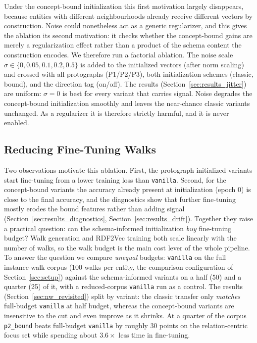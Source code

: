 \documentclass[a4paper,oneside,bibliography=totoc]{scrbook}
\begin{document}
Under the concept-bound initialization this first motivation largely disappears,
because entities with different neighbourhoods already receive different vectors
by construction. Noise could nonetheless act as a generic regularizer, and this
gives the ablation its second motivation: it checks whether the concept-bound
gains are merely a regularization effect rather than a product of the schema
content the construction encodes. We therefore run a factorial ablation. The
noise scale $\sigma \in \{0, 0.05, 0.1, 0.2, 0.5\}$ is added to the initialized
vectors (after norm scaling) and crossed with all protographs (P1/P2/P3), both
initialization schemes (classic, bound), and the direction tag (on/off). The
results (Section~\ref{sec:results_jitter}) are uniform: $\sigma=0$ is best for
every variant that carries signal. Noise degrades the concept-bound
initialization smoothly and leaves the near-chance classic variants unchanged.
As a regularizer it is therefore strictly harmful, and it is never enabled.

\subsection{Reducing Fine-Tuning Walks}
\label{sec:nw50}

Two observations motivate this ablation. First, the protograph-initialized
variants start fine-tuning from a lower training loss than \texttt{vanilla}.
Second, for the concept-bound variants the accuracy already present at
initialization (epoch 0) is close to the final accuracy, and the diagnostics show
that further fine-tuning mostly erodes the bound features rather than adding
signal (Section~\ref{sec:results_diagnostics}, Section~\ref{sec:results_drift}).
Together they raise a practical question: can the schema-informed initialization
\emph{buy} fine-tuning budget? Walk generation and RDF2Vec training both scale
linearly with the number of walks, so the walk budget is the main cost lever of
the whole pipeline. To answer the question we compare
\emph{unequal} budgets: \texttt{vanilla} on the full instance-walk corpus
(100 walks per entity, the comparison configuration of
Section~\ref{sec:setup}) against the schema-informed variants on a half (50) and
a quarter (25) of it, with a reduced-corpus \texttt{vanilla} run as a control.
The results (Section~\ref{sec:nw_revisited}) split by variant: the classic
transfer only \emph{matches} full-budget \texttt{vanilla} at half budget,
whereas the concept-bound variants are insensitive to the cut and even improve
as it shrinks. At a quarter of the corpus \texttt{p2\_bound} beats full-budget
\texttt{vanilla} by roughly $30$ points on the relation-centric focus set while
spending about $3.6\times$ less time in fine-tuning.
\end{document}
